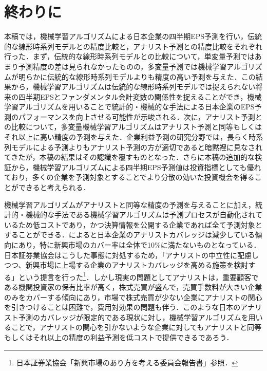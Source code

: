 \documentclass[a4paper，12pt]{jsarticle}
\begin{document}
\part{終わりに} \label{par:conclusion}

本稿では，機械学習アルゴリズムによる日本企業の四半期EPS予測を行い，伝統的な線形時系列モデルとの精度比較と，アナリスト予測との精度比較をそれぞれ行った．まず，伝統的な線形時系列モデルとの比較について，単変量予測ではあまり予測精度の差は見られなかったものの，多変量予測では機械学習アルゴリズムが明らかに伝統的な線形時系列モデルよりも精度の高い予測を与えた．この結果から，機械学習アルゴリズムは伝統的な線形時系列モデルでは捉えられない将来の四半期EPSとファンダメンタル会計変数の関係性を捉えることができ，機械学習アルゴリズムを用いることで統計的・機械的な手法による日本企業のEPS予測のパフォーマンスを向上させる可能性が示唆される．次に，アナリスト予測との比較について，多変量機械学習アルゴリズムはアナリスト予測と同等もしくはそれ以上に高い精度の予測を与えた．企業利益予測の研究分野では，長らく時系列モデルによる予測よりもアナリスト予測の方が適切であると暗黙裡に見なされてきたが，本稿の結果はその認識を覆すものとなった．さらに本稿の追加的な検証から，機械学習アルゴリズムによる四半期EPS予測値は投資指標としても優れており，多くの企業を予測対象とすることでより分散の効いた投資機会を得ることができると考えられる．

機械学習アルゴリズムがアナリストと同等な精度の予測を与えることに加え，統計的・機械的な手法である機械学習アルゴリズムは予測プロセスが自動化されているため低コストであり，かつ決算情報を公開する企業であれば全て予測対象とすることができる．\cite{yoneyama2010}によると日本企業のアナリストカバレッジは減少している傾向にあり，特に新興市場のカバー率は全体で10\%に満たないものとなっている．日本証券業協会はこうした事態に対処するため，「アナリストの中立性に配慮しつつ、新興市場に上場する企業のアナリストカバレッジを高める施策を検討する」という提言を行った\footnote{日本証券業協会「新興市場のあり方を考える委員会報告書」参照．}．しかし現実の問題としてアナリストは，重要顧客である機関投資家の保有比率が高く，株式売買が盛んで，売買手数料が大きい企業のみをカバーする傾向にあり\citep{nakai2006}，市場で株式売買が少ない企業にアナリストの関心を引きつけることは困難で，費用対効果の問題も伴う．このような日本のアナリスト予測のカバレッジが限定的である現状に対し，機械学習アルゴリズムを用いることで，アナリストの関心を引かないような企業に対してもアナリストと同等もしくはそれ以上の精度の利益予測を低コストで提供できるであろう．
\end{document}
